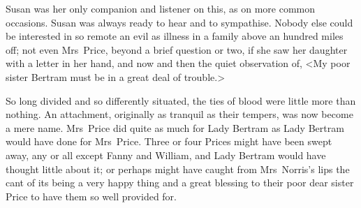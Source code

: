 Susan was her only companion and listener on this, as on more common occasions. Susan was always ready to hear and to sympathise. Nobody else could be interested in so remote an evil as illness in a family above an hundred miles off; not even Mrs~Price, beyond a brief question or two, if she saw her daughter with a letter in her hand, and now and then the quiet observation of, <My poor sister Bertram must be in a great deal of trouble.>

So long divided and so differently situated, the ties of blood were little more than nothing. An attachment, originally as tranquil as their tempers, was now become a mere name. Mrs~Price did quite as much for Lady Bertram as Lady Bertram would have done for Mrs~Price. Three or four Prices might have been swept away, any or all except Fanny and William, and Lady Bertram would have thought little about it; or perhaps might have caught from Mrs~Norris's lips the cant of its being a very happy thing and a great blessing to their poor dear sister Price to have them so well provided for. 